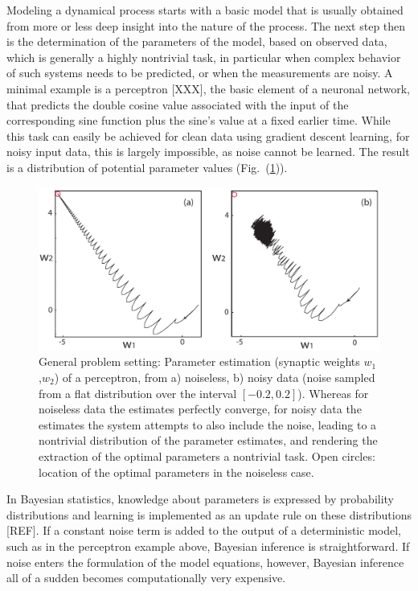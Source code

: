 \documentclass[11pt]{article}
\theoremstyle{definition}
\begin{document}
Modeling a dynamical process starts with a basic model that is usually obtained from more or less deep insight into the nature of the process. The next step then is the determination of the parameters of the model, based on observed data, which is generally a highly nontrivial task, in particular when complex behavior of such systems needs to be predicted, or when the measurements are noisy.
A minimal example is a perceptron [XXX], the basic element of a neuronal network, that predicts the double cosine value associated with the input of the corresponding sine function plus the sine's value at a fixed earlier time. While this task can easily be achieved for clean data using gradient descent learning, for noisy input data, this is largely impossible, as noise cannot be learned. The result is a distribution of potential parameter values (Fig.~(\ref{neural})).
\begin{figure}[h]
    \centering
    \includegraphics[width=1.0\textwidth]{neuron.pdf}
    \caption{General problem setting: Parameter estimation (synaptic weights $w_1$,$w_2$) of a perceptron, from a) noiseless, b) noisy data (noise sampled from a flat distribution over the  interval $[-0.2,0.2]$). Whereas for noiseless data the estimates perfectly converge, for noisy data the estimates  the system attempts to also include the noise, leading to a nontrivial distribution of the parameter estimates, and rendering the extraction of the optimal parameters a nontrivial task. Open circles: location of the optimal parameters in the noiseless case.}
    \label{neural}
\end{figure}

In Bayesian statistics, knowledge about parameters is expressed by probability distributions and learning is implemented as an update rule on these distributions [REF].
If a constant noise term is added to the output of a deterministic model, such as in the perceptron example above, Bayesian inference is straightforward.
If noise enters the formulation of the model equations, however, Bayesian inference all of a sudden becomes computationally very expensive.
\end{document}
